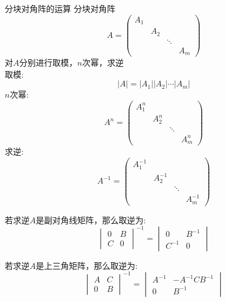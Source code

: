 \documentclass[lang=cn,10pt]{elegantbook}
\begin{document}
\begin{definition}{分块对角阵的运算}
    分块对角阵\begin{equation}
        A = \begin{pmatrix}
            A_1&   &      &  \\
               &A_2&      &  \\
               &   &\ddots&  \\
               &   &      &A_m
        \end{pmatrix}
    \end{equation}
    对$A$分别进行取模，$n$次幂，求逆\\
    取模:
    \begin{equation}
        \vert A \vert = \vert A_1 \vert \vert A_2 \vert \cdots \vert A_m \vert
    \end{equation}
    $n$次幂:
    \begin{equation}
        A^n = \begin{pmatrix}
             A_1^n&   &      &  \\
               &A_2^n&      &  \\
               &   &\ddots&  \\
               &   &      &A_m^n
        \end{pmatrix}
    \end{equation}
    求逆:
    \begin{equation}
         A^{-1} = \begin{pmatrix}
             A_1^{-1}&   &      &  \\
               &A_2^{-1}&      &  \\
               &   &\ddots&  \\
               &   &      &A_m^{-1}
                \end{pmatrix}
    \end{equation}
\end{definition}
若求逆$A$是副对角线矩阵，那么取逆为:
\begin{equation}
    \begin{vmatrix}
        0 & B\\
        C & 0
    \end{vmatrix}^{-1}
    = \begin{vmatrix}
         0 & B^{-1}\\
        C^{-1} & 0
    \end{vmatrix}
\end{equation}

若求逆$A$是上三角矩阵，那么取逆为:
\begin{equation}
    \begin{vmatrix}
        A & C\\
        0 & B
    \end{vmatrix}^{-1}
    = \begin{vmatrix}
         A^{-1} & -A^{-1}CB^{-1}\\
        0 & B^{-1}
    \end{vmatrix}
\end{equation}
\end{document}
